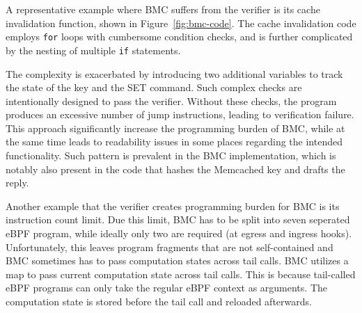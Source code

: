 A representative example where BMC suffers from the verifier is its cache
    invalidation function, shown in Figure~\ref{fig:bmc-code}.
The cache invalidation code employs \texttt{for} loops with cumbersome
    condition checks, and is further complicated by the nesting of multiple
    \texttt{if} statements.

The complexity is exacerbated by introducing two additional variables to track
    the state of the key and the SET command.
Such complex checks are intentionally designed to pass the
    verifier.
Without these checks, the program produces an excessive number of jump instructions,
    leading to verification failure.
This approach significantly increase the programming burden
    of BMC, while at the same time leads to readability issues in some places
    regarding the intended functionality.
Such pattern is prevalent in the BMC implementation, which is
    notably also present in the code that hashes the Memcached key and drafts the reply.

Another example that the verifier creates programming burden for BMC is its
    instruction count limit.
Due this limit, BMC has to be split into seven seperated eBPF program, while
    ideally only two are required (at egress and ingress hooks).
Unfortunately, this leaves program fragments that are not self-contained and
    BMC sometimes has to pass computation states across tail calls.
BMC utilizes a map to pass current computation state across tail calls.
This is because tail-called eBPF programs can only take the regular eBPF
    context as arguments.
The computation state is stored before the tail call and reloaded afterwards.


